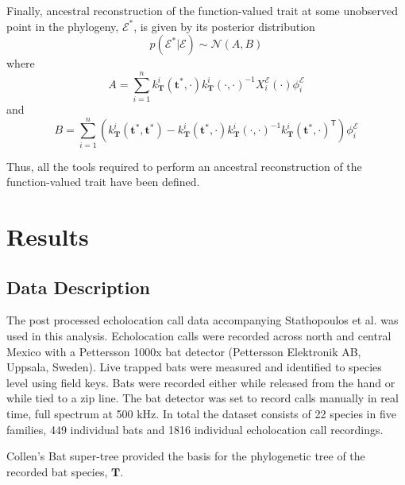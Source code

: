 \documentclass[wsdraft]{ws-rv9x6} %
\begin{document}
Finally, ancestral reconstruction of the function-valued trait at some unobserved point in the phylogeny, \(\mathcal{E}^*\), is given by its posterior distribution 
\[
p(\mathcal{E}^* | \mathcal{E})  \sim \mathcal{N}(A, B)
\]
where 
\[
A = \sum_{i=1}^{n} k_{\mathbf{T}}^i(\mathbf{t}^*, \cdot) k_{\mathbf{T}}^i(\cdot, \cdot)
^{-1} X_i^{\mathcal{E}} (\cdot) \phi_i^{\mathcal{E}}
\]
and
\[
B = \sum_{i=1}^{n}\left( k_{\mathbf{T}}^i(\mathbf{t}^*, \mathbf{t}^*) -  k_{\mathbf{T}}^i(\mathbf{t}^*, \cdot) k_{\mathbf{T}}^i(\cdot, \cdot)
^{-1} k_{\mathbf{T}}^i(\mathbf{t}^*, \cdot)^{\mathsf{T}} \right) \phi_i^{\mathcal{E}}
\]

Thus, all the tools required to perform an ancestral reconstruction of the function-valued trait have been defined. 

\section{Results}

\subsection{Data Description}

The post processed echolocation call data accompanying Stathopoulos et al. \cite{stathopoulos2017bat} was used in this analysis. Echolocation calls were recorded across north and central Mexico with a Pettersson 1000x bat detector (Pettersson Elektronik AB, Uppsala, Sweden). Live trapped bats were measured and identified to species level using field keys.\cite{ceballos2005mamiferos} \cite{medellin2sanchez} Bats were recorded either while released from the hand or while tied to a zip line. The bat detector was set to record calls manually in real time, full spectrum at 500 kHz. 
In total the dataset consists of 22 species in five families, 449 individual bats and 1816 individual echolocation call recordings. 

Collen's \cite{collen2012evolution} Bat super-tree provided the basis for the phylogenetic tree of the recorded bat species, \(\mathbf{T}\). 
\end{document}
